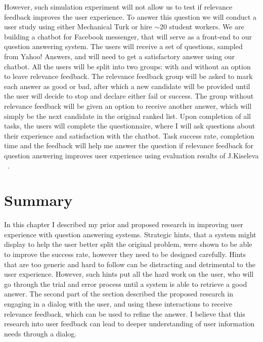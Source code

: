 However, such simulation experiment will not allow us to test if relevance feedback improves the user experience.
To answer this question we will conduct a user study using either Mechanical Turk or hire $\sim 20$ student workers.
We are building a chatbot for Facebook messenger, that will serve as a front-end to our question answering system.
The users will receive a set of questions, \eg sampled from Yahoo! Answers, and will need to get a satisfactory answer using our chatbot.
All the users will be split into two groups: with and without an option to leave relevance feedback.
The relevance feedback group will be asked to mark each answer as good or bad, after which a new candidate will be provided until the user will decide to stop and declare either fail or success.
The group without relevance feedback will be given an option to receive another answer, which will simply be the next candidate in the original ranked list.
Upon completion of all tasks, the users will complete the questionnaire, where I will ask questions about their experience and satisfaction with the chatbot.
Task success rate, completion time and the feedback will help me answer the question if relevance feedback for question answering improves user experience using evaluation results of J.Kiseleva \etal~\cite{kiseleva2016understanding}.

\section{Summary}
\label{section:users:summary}

In this chapter I described my prior and proposed research in improving user experience with question answering systems.
Strategic hints, that a system might display to help the user better split the original problem, were shown to be able to improve the success rate, however they need to be designed carefully.
Hints that are too generic and hard to follow can be distracting and detrimental to the user experience.
However, such hints put all the hard work on the user, who will go through the trial and error process until a system is able to retrieve a good answer.
The second part of the section described the proposed research in engaging in a dialog with the user, and using these interactions to receive relevance feedback, which can be used to refine the answer.
I believe that this research into user feedback can lead to deeper understanding of user information needs through a dialog.
